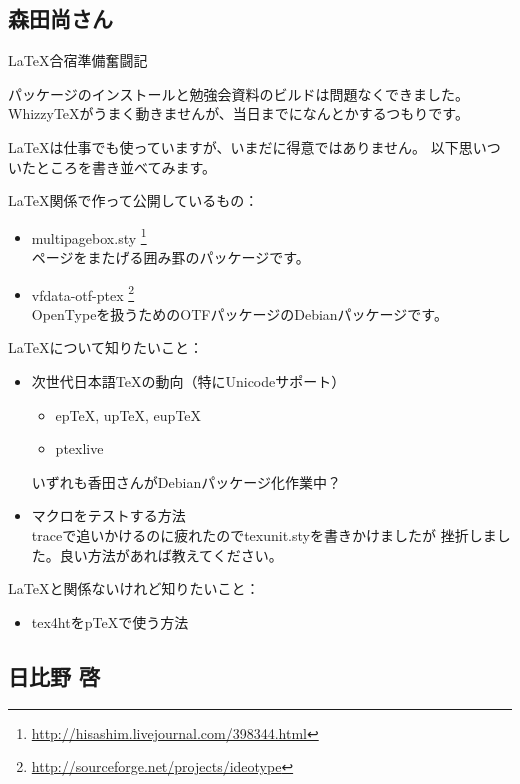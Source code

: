\documentclass[mingoth,a4paper]{jsarticle}
\begin{document}
\subsection{森田尚さん}


LaTeX合宿準備奮闘記

パッケージのインストールと勉強会資料のビルドは問題なくできました。
WhizzyTeXがうまく動きませんが、当日までになんとかするつもりです。

\LaTeX{}は仕事でも使っていますが、いまだに得意ではありません。
以下思いついたところを書き並べてみます。

LaTeX関係で作って公開しているもの：
\begin{itemize}
 
 \item  multipagebox.sty
	\footnote{\url{http://hisashim.livejournal.com/398344.html}}\\
    ページをまたげる囲み罫のパッケージです。
    
 \item  vfdata-otf-ptex
	\footnote{\url{http://sourceforge.net/projects/ideotype}}\\
	OpenTypeを扱うためのOTFパッケージのDebianパッケージです。
\end{itemize}

LaTeXについて知りたいこと：

\begin{itemize}
 \item  次世代日本語TeXの動向（特にUnicodeサポート）
	\begin{itemize}
	 \item  epTeX, upTeX, eupTeX
	 \item  ptexlive
	\end{itemize}    
いずれも香田さんがDebianパッケージ化作業中？

 \item  マクロをテストする方法\\
    traceで追いかけるのに疲れたのでtexunit.styを書きかけましたが
    挫折しました。良い方法があれば教えてください。
\end{itemize}

LaTeXと関係ないけれど知りたいこと：

\begin{itemize}
 \item tex4htをpTeXで使う方法
\end{itemize}


\subsection{日比野 啓}
\end{document}

